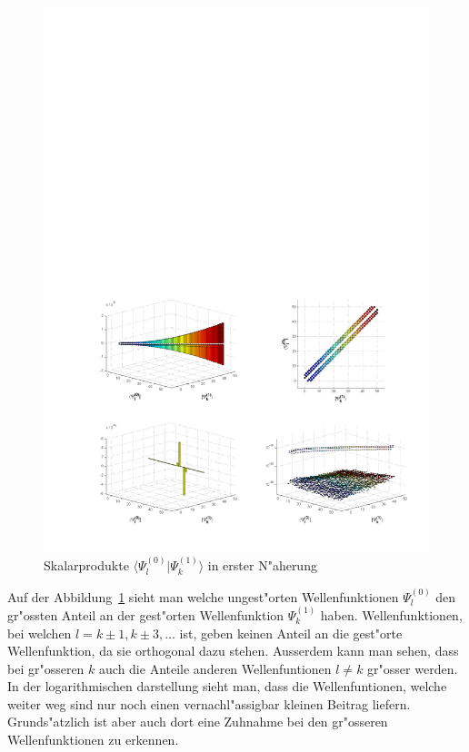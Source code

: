 \begin{refsection}
\begin{figure}[h]	%
\centering
\includegraphics[width=1.0\textwidth]{anharmonisch/images/x4/Stoerung1Skalare.pdf}
\caption{Skalarprodukte $\langle\Psi_l^{(0)}|\Psi_k^{(1)}\rangle$ in erster N"aherung
\label{skript:x4_Stoerung1Skalare}}
\end{figure}

Auf der Abbildung~\ref{skript:x4_Stoerung1Skalare} sieht man welche ungest"orten Wellenfunktionen $\Psi_l^{(0)}$ den gr"ossten Anteil an der gest"orten Wellenfunktion $\Psi_k^{(1)}$ haben. Wellenfunktionen, bei welchen $l=k\pm 1,k\pm 3,\dots$ ist, geben keinen Anteil an die gest"orte Wellenfunktion, da sie orthogonal dazu stehen. Ausserdem kann man sehen, dass bei gr"osseren $k$ auch die Anteile anderen Wellenfuntionen $l\neq k$ gr"osser werden. In der logarithmischen darstellung sieht man, dass die Wellenfuntionen, welche weiter weg sind nur noch einen vernachl"assigbar kleinen Beitrag liefern. Grunds"atzlich ist aber auch dort eine Zuhnahme bei den gr"osseren Wellenfunktionen zu erkennen.



\end{refsection}
